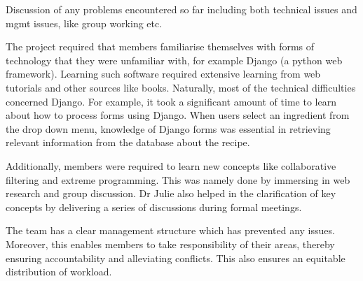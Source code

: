 Discussion of any problems encountered so far including both technical issues and mgmt issues, like group working etc.

The project required that members familiarise themselves with forms of technology that they were unfamiliar with, for example Django (a python web framework). Learning such software required extensive learning from web tutorials and other sources like books. Naturally, most of the technical difficulties concerned Django. For example, it took a significant amount of time to learn about how to process forms using Django. When users select an ingredient from the drop down menu, knowledge of Django forms was essential in retrieving relevant information from the database about the recipe. 

Additionally, members were required to learn new concepts like collaborative filtering and extreme programming. This was namely done by immersing in web research and group discussion. Dr Julie also helped in the clarification of key concepts by delivering a series of discussions during formal meetings.

The team has a clear management structure which has prevented any issues. Moreover, this enables members to take responsibility of their areas, thereby ensuring accountability and alleviating conflicts. This also ensures an equitable distribution of workload.
